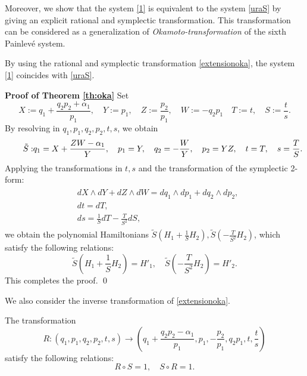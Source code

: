 Moreover, we show that the system \eqref{1} is equivalent to the system \eqref{uraS} by giving an explicit rational and symplectic transformation. This transformation can be considered as a generalization of {\it Okamoto-transformation \it}of the sixth Painlev\'e system.

\begin{thm}\label{th:oka}
By using the rational and symplectic transformation \eqref{extensionoka}, the system \eqref{1} coincides with \eqref{uraS}.
\end{thm}


{\bf Proof of Theorem \ref{th:oka}}
Set
\begin{equation*}
X:=q_1+\frac{q_2p_2+\alpha_1}{p_1}, \quad Y:=p_1, \quad Z:=\frac{p_2}{p_1}, \quad W:=-q_2p_1 \quad T:=t, \quad S:=\frac{t}{s}.
\end{equation*}
By resolving in $q_1,p_1,q_2,p_2,t,s$, we obtain
\begin{equation}\tag*{$\tilde{S}:$}
q_1=X+\frac{ZW-\alpha_1}{Y}, \quad p_1=Y, \quad q_2=-\frac{W}{Y}, \quad p_2=YZ, \quad t=T, \quad s=\frac{T}{S}.
\end{equation}
Applying the transformations in $t,s$ and the transformation of the symplectic 2-form:
\begin{align}
\begin{split}
&dX \wedge dY +dZ \wedge dW=dq_1 \wedge dp_1 +dq_2 \wedge dp_2,\\
&dt=dT,\\
&ds=\frac{1}{S}dT-\frac{T}{S^2}dS,
\end{split}
\end{align}
we obtain the polynomial Hamiltonians $\tilde{S}(H_1+\frac{1}{S}H_2),\tilde{S}(-\frac{T}{S^2}H_2)$, which satisfy the following relations:
$$
\tilde{S}(H_1+\frac{1}{S}H_2)=H'_1, \quad \tilde{S}(-\frac{T}{S^2}H_2)=H'_2.
$$
This completes the proof. \qed


We also consider the inverse transformation of \eqref{extensionoka}.
\begin{Lemma}\label{th:inoka}
The transformation
\begin{equation}
R:(q_1,p_1,q_2,p_2,t,s) \rightarrow \left(q_1+\frac{q_2p_2-\alpha_1}{p_1},p_1,-\frac{p_2}{p_1},q_2p_1,t,\frac{t}{s}\right)
\end{equation}
satisfy the following relations\rm{:\rm}
\begin{equation}
R \circ S=1, \quad S \circ R=1.
\end{equation}
\end{Lemma}

